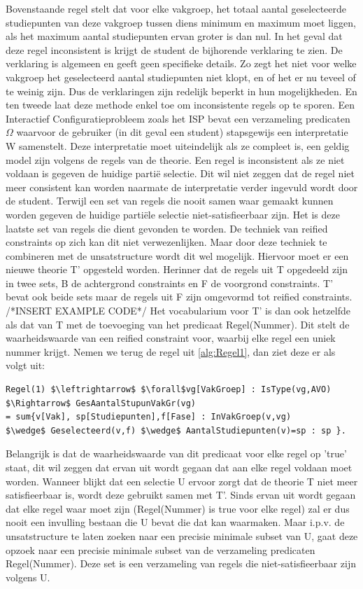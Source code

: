 Bovenstaande regel stelt dat voor elke vakgroep, het totaal aantal geselecteerde studiepunten van deze vakgroep tussen diens minimum en maximum moet liggen, als het maximum aantal studiepunten ervan groter is dan nul. In het geval dat deze regel inconsistent is krijgt de student de bijhorende verklaring te zien. De verklaring is algemeen en geeft geen specifieke details. Zo zegt het niet voor welke vakgroep het geselecteerd aantal studiepunten niet klopt, en of het er nu teveel of te weinig zijn. Dus de verklaringen zijn redelijk beperkt in hun mogelijkheden. En ten tweede laat deze methode enkel toe om inconsistente regels op te sporen. Een Interactief Configuratieprobleem zoals het ISP bevat een verzameling predicaten $\Omega$ waarvoor de gebruiker (in dit geval een student) stapsgewijs een interpretatie W samenstelt. Deze interpretatie moet uiteindelijk als ze compleet is, een geldig model zijn volgens de regels van de theorie. Een regel is inconsistent als ze niet voldaan is gegeven de huidige parti\"{e} selectie. Dit wil niet zeggen dat de regel niet meer consistent kan worden naarmate de interpretatie verder ingevuld wordt door de student. Terwijl een set van regels die nooit samen waar gemaakt kunnen worden gegeven de huidige parti\"{e}le selectie niet-satisfieerbaar zijn. Het is deze laatste set van regels die dient gevonden te worden. De techniek van reified constraints op zich kan dit niet verwezenlijken. Maar door deze techniek te combineren met de unsatstructure wordt dit wel mogelijk. Hiervoor moet er een nieuwe theorie T' opgesteld worden. Herinner dat de regels uit T opgedeeld zijn in twee sets, B de achtergrond constraints en F de voorgrond constraints. T' bevat ook beide sets maar de regels uit F zijn omgevormd tot reified constraints. 
/*INSERT EXAMPLE CODE*/
Het vocabularium voor T' is dan ook hetzelfde als dat van T met de toevoeging van het predicaat Regel(Nummer). Dit stelt de waarheidswaarde van een reified constraint voor, waarbij elke regel een uniek nummer krijgt. Nemen we terug de regel uit \ref{alg:Regel1}, dan ziet deze er als volgt uit: 
\lstset{basicstyle=\scriptsize}
\begin{lstlisting}[mathescape, caption=IDP Reified Constraint Example 2, frame=single]
Regel(1) $\leftrightarrow$ $\forall$vg[VakGroep] : IsType(vg,AVO) $\Rightarrow$ GesAantalStupunVakGr(vg) 
= sum{v[Vak], sp[Studiepunten],f[Fase] : InVakGroep(v,vg) 
$\wedge$ Geselecteerd(v,f) $\wedge$ AantalStudiepunten(v)=sp : sp }.
\end{lstlisting}
Belangrijk is dat de waarheidswaarde van dit predicaat voor elke regel op 'true' staat, dit wil zeggen dat ervan uit wordt gegaan dat aan elke regel voldaan moet worden. Wanneer blijkt dat een selectie U ervoor zorgt dat de theorie T niet meer satisfieerbaar is, wordt deze gebruikt samen met T'. Sinds ervan uit wordt gegaan dat elke regel waar moet zijn (Regel(Nummer) is true voor elke regel) zal er dus nooit een invulling bestaan die U bevat die dat kan waarmaken. Maar i.p.v. de unsatstructure te laten zoeken naar een precisie minimale subset van U, gaat deze opzoek naar een precisie minimale subset van de verzameling predicaten Regel(Nummer). Deze set is een verzameling van regels die niet-satisfieerbaar zijn volgens U.

